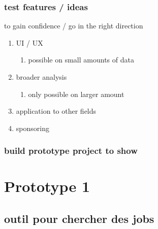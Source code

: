 \documentclass[11pt]{article}
\begin{document}
\subsubsection{test features / ideas}
\label{sec:orgcfba8db}
to gain confidence / go in the right direction
\begin{enumerate}
\item UI / UX
\label{sec:orge97d626}
\begin{enumerate}
\item possible on small amounts of data
\label{sec:org7d10845}
\end{enumerate}
\item broader analysis
\label{sec:org4a7b58a}
\begin{enumerate}
\item only possible on larger amount
\label{sec:org5aa07d3}
\end{enumerate}
\item application to other fields
\label{sec:org2cd027a}
\item sponsoring
\label{sec:org021a312}
\end{enumerate}
\subsubsection{build prototype project to show}
\label{sec:orgcf77d40}
\section{Prototype 1}
\label{sec:org9fda98f}
\subsection{outil pour chercher des jobs}
\label{sec:orgb149431}
\end{document}
